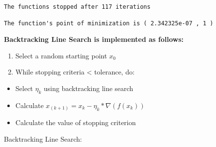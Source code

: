 \documentclass[
  letterpaper,
  DIV=11,
  numbers=noendperiod]{scrartcl}
\newenvironment{Shaded}{\begin{snugshade}}{\end{snugshade}}
\newcommand{\FunctionTok}[1]{\textcolor[rgb]{0.28,0.35,0.67}{#1}}
\newcommand{\NormalTok}[1]{\textcolor[rgb]{0.00,0.23,0.31}{#1}}
\newcommand{\SpecialCharTok}[1]{\textcolor[rgb]{0.37,0.37,0.37}{#1}}
\newcommand{\StringTok}[1]{\textcolor[rgb]{0.13,0.47,0.30}{#1}}
\providecommand{\tightlist}{%
  \setlength{\itemsep}{0pt}\setlength{\parskip}{0pt}}\usepackage{longtable,booktabs,array}
\begin{document}
\begin{verbatim}
The functions stopped after 117 iterations 
\end{verbatim}

\begin{Shaded}
\end{Shaded}

\begin{verbatim}
The function's point of minimization is ( 2.342325e-07 , 1 ) 
\end{verbatim}

\textbf{Backtracking Line Search is implemented as follows:}

\begin{enumerate}
\def\labelenumi{\arabic{enumi}.}
\tightlist
\item
  Select a random starting point \(x_0\)\\
\item
  While stopping criteria \textless{} tolerance, do:
\end{enumerate}

\begin{itemize}
\tightlist
\item
  Select \(η_k\) using backtracking line search
\item
  Calculate \(x_{(k+1)} = x_k - η_k * ∇(f(x_k))\)\\
\item
  Calculate the value of stopping criterion
\end{itemize}

Backtracking Line Search:
\end{document}
